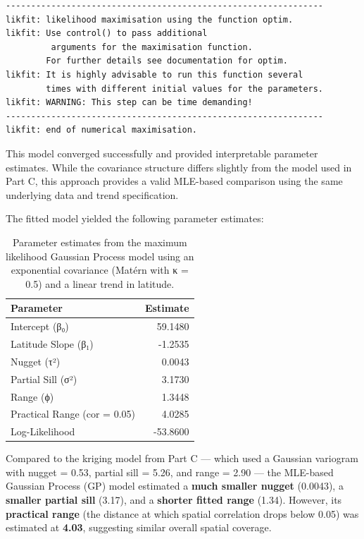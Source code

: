 \documentclass[
  11pt,
]{article}
\begin{document}
\begin{verbatim}
---------------------------------------------------------------
likfit: likelihood maximisation using the function optim.
likfit: Use control() to pass additional
         arguments for the maximisation function.
        For further details see documentation for optim.
likfit: It is highly advisable to run this function several
        times with different initial values for the parameters.
likfit: WARNING: This step can be time demanding!
---------------------------------------------------------------
likfit: end of numerical maximisation.
\end{verbatim}

This model converged successfully and provided interpretable parameter
estimates. While the covariance structure differs slightly from the
model used in Part C, this approach provides a valid MLE-based
comparison using the same underlying data and trend specification.

The fitted model yielded the following parameter estimates:

\begin{table}

\caption{Parameter estimates from the maximum likelihood Gaussian Process model
using an exponential covariance (Matérn with κ = 0.5) and a linear trend
in latitude.}
\centering
\begin{tabular}[t]{lr}
\toprule
Parameter & Estimate\\
\midrule
Intercept (β₀) & 59.1480\\
Latitude Slope (β₁) & -1.2535\\
Nugget (τ²) & 0.0043\\
Partial Sill (σ²) & 3.1730\\
Range (ϕ) & 1.3448\\
\addlinespace
Practical Range (cor = 0.05) & 4.0285\\
Log-Likelihood & -53.8600\\
\bottomrule
\end{tabular}
\end{table}

Compared to the kriging model from Part C --- which used a Gaussian
variogram with nugget = 0.53, partial sill = 5.26, and range = 2.90 ---
the MLE-based Gaussian Process (GP) model estimated a \textbf{much
smaller nugget} (0.0043), a \textbf{smaller partial sill} (3.17), and a
\textbf{shorter fitted range} (1.34). However, its \textbf{practical
range} (the distance at which spatial correlation drops below 0.05) was
estimated at \textbf{4.03}, suggesting similar overall spatial coverage.
\end{document}
